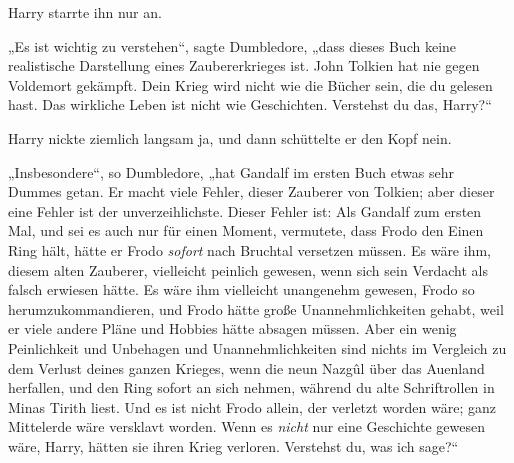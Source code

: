 Harry starrte ihn nur an.

„Es ist wichtig zu verstehen“, sagte Dumbledore, „dass dieses Buch keine realistische Darstellung eines Zaubererkrieges ist. John Tolkien hat nie gegen Voldemort gekämpft. Dein Krieg wird nicht wie die Bücher sein, die du gelesen hast. Das wirkliche Leben ist nicht wie Geschichten. Verstehst du das, Harry?“

Harry nickte ziemlich langsam ja, und dann schüttelte er den Kopf nein.

„Insbesondere“, so Dumbledore, „hat Gandalf im ersten Buch etwas sehr Dummes getan. Er macht viele Fehler, dieser Zauberer von Tolkien; aber dieser eine Fehler ist der unverzeihlichste. Dieser Fehler ist: Als Gandalf zum ersten Mal, und sei es auch nur für einen Moment, vermutete, dass Frodo den Einen Ring hält, hätte er Frodo \emph{sofort} nach Bruchtal versetzen müssen. Es wäre ihm, diesem alten Zauberer, vielleicht peinlich gewesen, wenn sich sein Verdacht als falsch erwiesen hätte. Es wäre ihm vielleicht unangenehm gewesen, Frodo so herumzukommandieren, und Frodo hätte große Unannehmlichkeiten gehabt, weil er viele andere Pläne und Hobbies hätte absagen müssen. Aber ein wenig Peinlichkeit und Unbehagen und Unannehmlichkeiten sind nichts im Vergleich zu dem Verlust deines ganzen Krieges, wenn die neun Nazgûl über das Auenland herfallen, und den Ring sofort an sich nehmen, während du alte Schriftrollen in Minas Tirith liest. Und es ist nicht Frodo allein, der verletzt worden wäre; ganz Mittelerde wäre versklavt worden. Wenn es \emph{nicht} nur eine Geschichte gewesen wäre, Harry, hätten sie ihren Krieg verloren. Verstehst du, was ich sage?“

